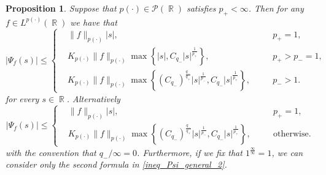 \documentclass[11pt,reqno]{amsart}
\newtheorem{prop}[theorem]{Proposition}
\theoremstyle{definition}
\theoremstyle{definition}
\theoremstyle{definition}
\DeclareMathOperator{\R}{\mathbb{R}}
\newcommand{\p}{p(\cdot)}
\begin{document}


\begin{prop}\label{prop_bounded}
    Suppose that $p(\cdot)\in \mathcal{P}(\R)$ satisfies $p_{+}<\infty$. Then for any $f\in L^{p(\cdot)}(\R)$ we have that
    \begin{equation}\label{ineq_Psi_general}
        |\Psi_f(s)|\leq \left\{\begin{alignedat}{3}
            &\|f\|_{\p}|s|, &&p_{+}=1,\\
            &K_{\p}\|f\|_{\p}\max\left\{|s|,C_{q_{-}}|s|^{\frac{1}{p_{+}}}\right\}, &&p_{+}>p_{-}=1,\\
&K_{p(\cdot)}\|f\|_{p(\cdot)}\max\left\{(C_{q_{-}})^{\frac{q_{-}}{q_{+}}}|s|^{\frac{1}{p_{-}}},C_{q_{-}}|s|^{\frac{1}{p_{+}}}\right\}, \quad&&p_{-}>1.
       \end{alignedat} \right.
    \end{equation}
    for every $s\in\R$. Alternatively
\begin{equation}\label{ineq_Psi_general_2}
        |\Psi_f(s)|\leq 
         \left\{\begin{alignedat}{3}
            &\|f\|_{\p}|s|, &&p_{+}=1, \\
            &K_{p(\cdot)}\|f\|_{p(\cdot)}\max\left\{(C_{q_{-}})^{\frac{q_{-}}{q_{+}}}|s|^{\frac{1}{p_{-}}},C_{q_{-}}|s|^{\frac{1}{p_{+}}}\right\}, \quad&&\text{otherwise}.
        \end{alignedat}\right.
    \end{equation}
    with the convention that $q_{-}/\infty=0$. Furthermore, if we fix that $1^{\frac{\infty}{\infty}}=1$, we can consider only the second formula in \eqref{ineq_Psi_general_2}.
\end{prop}
\end{document}
